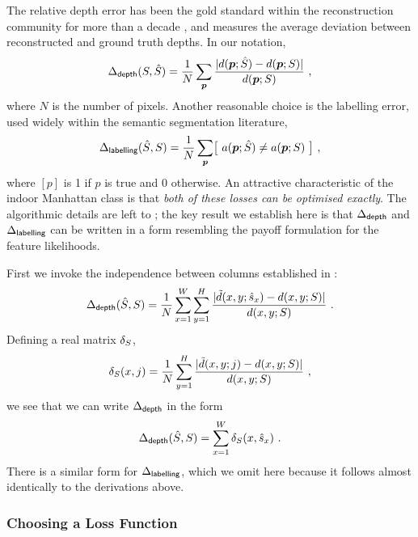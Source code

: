 The relative depth error has been the gold standard within the
reconstruction community for more than a decade \cite{Hartley04}, and
measures the average deviation between reconstructed and ground truth
depths. In our notation,
\begin{equation}
  \label{eq:depth-loss}
  \DepthLoss(\Seam,\EstSeam)
  =
  \frac{1}{N}
  \sum_{\Pixel}
  \frac
      {\abs{\Depth(\Pixel;\EstSeam) - \Depth(\Pixel;\Seam)}}
      {\Depth(\Pixel;\Seam)} ~,
\end{equation}
where $N$ is the number of pixels. Another reasonable choice is the
labelling error, used widely within the semantic segmentation
literature,
\begin{equation}
  \label{eq:label-loss}
  \LblLoss(\EstSeam,\Seam)
  =
  \frac{1}{N}
  \sum_{\Pixel}
  \bigl[~\Orient(\Pixel;\EstSeam) \neq \Orient(\Pixel;\Seam)~\bigr] ~,
\end{equation}
where $[p]$ is 1 if $p$ is true and 0 otherwise. An attractive
characteristic of the indoor Manhattan class is that \textit{both of
  these losses can be optimised exactly}. The algorithmic details are
left to ; the key result we establish here is that
$\DepthLoss$ and $\LblLoss$ can be written in a form resembling the
payoff formulation  for the feature likelihoods.

First we invoke the independence between columns established in
:
\begin{equation}
  \DepthLoss(\EstSeam,\Seam)
  =
  \frac{1}{N}
  \sum_{x=1}^{\Width}
  \sum_{y=1}^{\Height}
  \frac
      {\abs{\tilde{\Depth}(x,y;\hat{\seam}_x) - \Depth(x,y;\Seam)}}
      {\Depth(x,y;\Seam)} ~.
\end{equation}
Defining a real matrix $\LossMat_{\Seam}$,
\begin{equation}
  \LossMat_{\Seam}(x,j) =
  \frac{1}{N}
  \sum_{y=1}^H
  \frac
      {\abs{\tilde{\Depth}(x,y;j) - \Depth(x,y;\Seam)}}
      {\Depth(x,y;\Seam)} ~,
\end{equation}
we see that we can write $\DepthLoss$ in the form
\begin{equation}
  \DepthLoss(\EstSeam,\Seam)
  =
  \sum_{x=1}^{\Width} \LossMat_{\Seam}(x,\hat{\seam}_x) ~.
  \label{eq:depth-loss-matrix}
\end{equation}
There is a similar form for $\LblLoss$, which we omit here because it
follows almost identically to the derivations above.

\subsubsection{Choosing a Loss Function}


